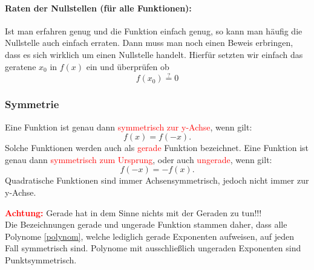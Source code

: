 \paragraph{Raten der Nullstellen (für alle Funktionen):}
Ist man erfahren genug und die Funktion einfach genug, so kann man häufig die Nullstelle auch einfach erraten. Dann muss man noch einen Beweis erbringen, dass es sich wirklich um einen Nullstelle handelt. Hierfür setzten wir einfach das geratene $x_0$ in $f(x)$ ein und überprüfen ob 
\begin{equation*}
f(x_0) \stackrel{?}{=} 0
\end{equation*}


\subsubsection{Symmetrie} \label{sec:symmetrie}
Eine Funktion ist genau dann \textcolor{red}{symmetrisch zur y-Achse}, wenn gilt:
\begin{equation*}
f(x)=f(-x).
\end{equation*}
Solche Funktionen werden auch als \textcolor{red}{gerade} Funktion bezeichnet. Eine Funktion ist genau dann \textcolor{red}{symmetrisch zum Ursprung}, oder auch \textcolor{red}{ungerade}, wenn gilt:
\begin{equation*}
f(-x)=-f(x).
\end{equation*}
Quadratische Funktionen sind immer Achsensymmetrisch, jedoch nicht immer zur y-Achse.
\begin{warning}
	\textbf{\textcolor{red}{Achtung:}} Gerade hat in dem Sinne nichts mit der Geraden zu tun!!!\\
	Die Bezeichnungen gerade und ungerade Funktion stammen daher, dass alle Polynome \ref{polynom}, welche lediglich gerade Exponenten aufweisen, auf jeden Fall symmetrisch sind. Polynome mit ausschließlich ungeraden Exponenten sind Punktsymmetrisch.
\end{warning}
